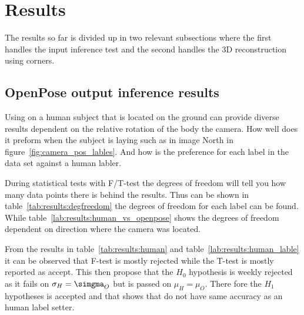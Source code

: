 \section{Results}\label{sec:results}


The results so far is divided up in two relevant subsections where the first handles the input inference test and the second handles the 3D reconstruction using \aruco corners.
\subsection{OpenPose output inference results}%
\label{sub:res:op_inference}
Using \openpose{ } on a human subject that is located on the ground can provide diverse results dependent on the relative rotation of the body the camera.
How well does it preform when the subject is laying such as in image North in figure~\ref{fig:camera_pos_lables}.
And how is the preference for each label in the \operpose{ } data set against a human labler.

During statistical tests with F/T-test the degrees of freedom will tell you how many data points there is behind the results.
Thus can be shown in table~\ref{tab:results:degfreedom} the degrees of freedom for each label can be found.
While table~\ref{lab:results:human_vs_openpose} shows the degrees of freedom dependent on direction where the camera was located.

From the results in table~\ref{tab:results:human} and table~\ref{lab:results:human_lable} it can be observed that F-test is mostly rejected while the T-test is mostly reported as accept.
This then propose that the $H_0$ hypothesis is weekly rejected as it fails on $\sigma_H = \simgma_O$ but is passed on $\mu_H = \mu_O$.
There fore the $H_1$ hypotheses is accepted and that shows that \openpose{ } do not have same accuracy as an human label setter.



